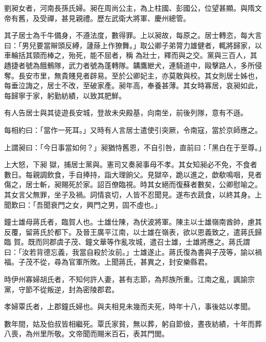 \begin{pinyinscope}
 劉昶女者，河南長孫氏婦。昶在周尚公主，為上柱國、彭國公，位望甚顯。與隋文帝有舊，及受禪，甚見親禮。歷左武衛大將軍、慶州總管。



 其子居士為千牛備身，不遵法度，數得罪。上以昶故，每原之。居士轉恣，每大言曰：「男兒要當辮頭反縛，蘧蒢上作獠舞。」取公卿子弟膂力雄健者，輒將歸家，以車輪括其頸而棒之，殆死，能不屈者，稱
 為壯士，釋而與之交。黨與三百人，其趫捷者號為餓鶻隊，武力者號為蓬轉隊。韝鷹紲犬，連騎道中，毆擊路人，多所侵奪。長安市里，無貴賤見者辟易。至於公卿妃主，亦莫敢與校。其女則居士姊也，每垂泣誨之，居士不改，至破家產。昶年高，奉養甚薄。其女時寡居，哀昶如此，每歸寧于家，躬勤紡績，以致其肥鮮。



 有人告居士與其徒遊長安城，登故未央殿基，向南坐，前後列隊，意有不遜。



 每相約曰：「當作一死耳。」又時有人言居士遣使引突厥，令南寇，當於京師應之。



 上謂昶曰：「今日事當如何？」昶猶恃舊恩，不自引咎，直前曰：「黑白在于至尊。」



 上大怒，下昶
 獄，捕居士黨與。憲司又奏昶事母不孝。其女知昶必不免，不食者數日。每親調飲食，手自捧持，詣大理餉父。見獄卒，跪以進之，歔欷鳴咽，見者傷之，居士斬，昶賜死於家。詔百僚臨視。時其女絕而復蘇者數矣，公卿慰喻之。其女言父無罪，坐子及禍。詞情哀切，人皆不忍聞見。遂布衣蔬食，以終其身。上聞歎曰：「吾聞衰門之女，興門之男，固不虛也。」



 鐘士雄母蔣氏者，臨賀人也。士雄仕陳，為伏波將軍。陳主以士雄嶺南酋帥，慮其反覆，留蔣氏於都下。及晉王廣平江南，以士雄在嶺表，欲以恩義致之，遣蔣氏歸臨
 賀。既而同郡虞子茂、鐘文華等作亂攻城，遣召士雄，士雄將應之。蔣氏謂曰：「汝若背德忘義，我當自殺於汝前。」士雄遂止。蔣氏復為書與子茂等，諭以禍福。子茂不從，尋為官軍所敗。上聞蔣氏，甚異之，封安樂縣君。



 時伊州寡婦胡氏者，不知何許人妻，甚有志節，為邦族所重。江南之亂，諷諭宗黨，守節不從叛逆，封為密陵郡君。



 孝婦覃氏者，上郡鐘氏婦也。與夫相見未幾而夫死，時年十八，事後姑以孝聞。



 數年間，姑及伯叔皆相繼死。覃氏家貧，無以葬，躬自節儉，晝夜紡績，十年而葬八喪，為州里所敬。文帝聞而賜米百石，表其門閭。




\end{pinyinscope}
